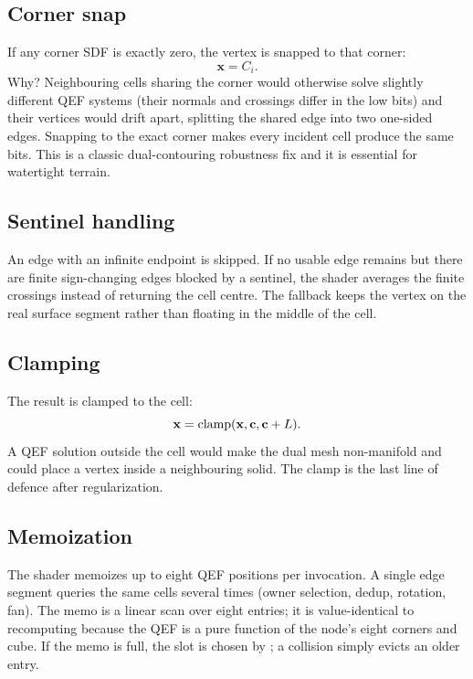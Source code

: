 \subsection{Corner snap}

If any corner SDF is exactly zero, the vertex is snapped to that corner:
\begin{equation}
  \mathbf{x} = C_i.
\end{equation}
Why?  Neighbouring cells sharing the corner would otherwise solve slightly
different QEF systems (their normals and crossings differ in the low bits)
and their vertices would drift apart, splitting the shared edge into two
one-sided edges.  Snapping to the exact corner makes every incident cell
produce the same bits.  This is a classic dual-contouring robustness fix
and it is essential for watertight terrain.

\subsection{Sentinel handling}

An edge with an infinite endpoint is skipped.  If no usable edge remains
but there are finite sign-changing edges blocked by a sentinel, the shader
averages the finite crossings instead of returning the cell centre.  The
fallback keeps the vertex on the real surface segment rather than floating
in the middle of the cell.

\subsection{Clamping}

The result is clamped to the cell:
\begin{equation}
  \mathbf{x} = \operatorname{clamp}(\mathbf{x}, \mathbf{c}, \mathbf{c}+L).
\end{equation}
A QEF solution outside the cell would make the dual mesh non-manifold and
could place a vertex inside a neighbouring solid.  The clamp is the last
line of defence after regularization.

\subsection{Memoization}

The shader memoizes up to eight QEF positions per invocation.  A single
edge segment queries the same cells several times (owner selection, dedup,
rotation, fan).  The memo is a linear scan over eight entries; it is
value-identical to recomputing because the QEF is a pure function of the
node's eight corners and cube.  If the memo is full, the slot is chosen by
; a collision simply evicts an older entry.

